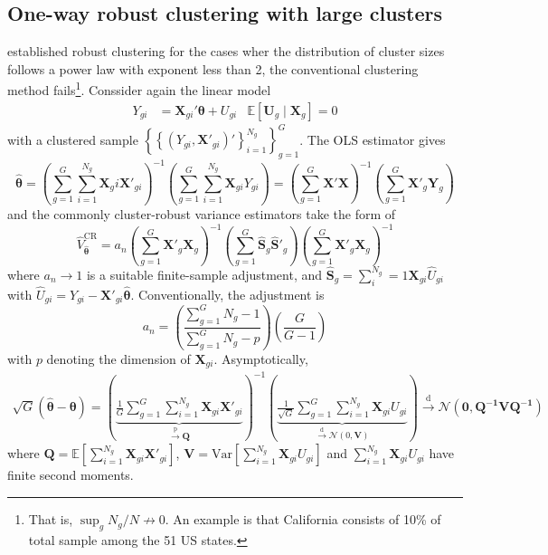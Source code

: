 \documentclass[twoside]{article}
\begin{document}
\subsection{One-way robust clustering with large clusters}
\citet{sasaki2022non} established robust clustering for the cases wher the distribution of cluster sizes follows a power law with exponent less than 2, the conventional clustering method fails\footnote{That is, $\sup_g N_g/N\not\rightarrow 0$. An example is that California consists of 10\% of total sample among the 51 US states.}. Conssider again the linear model
\begin{align*}
    Y_{gi} &= \mathbf{X}_{gi}'\boldsymbol{\theta} + U_{gi} & \mathbb{E}\left[\mathbf{U}_{g}\mid \mathbf{X}_g\right]=0
\end{align*}
with a clustered sample $\left\{ \left\{ \left(Y_{gi},\mathbf{X}'_{gi}\right)' \right\}^{N_g}_{i=1} \right\}^G_{g=1}$. The OLS estimator gives 
\begin{equation*}
    \hat{\boldsymbol{\theta}} = \left(\sum^G_{g=1}\sum^{N_g}_{i=1}\mathbf{X}_gi\mathbf{X}'_{gi}\right)^{-1} \left(\sum^G_{g=1}\sum^{N_g}_{i=1}\mathbf{X}_{gi}Y_{gi}\right) = \left(\sum^G_{g=1}\mathbf{X}'\mathbf{X}\right)^{-1}\left(\sum^G_{g=1}\mathbf{X}'_g\mathbf{Y}_g\right)
\end{equation*}
and the commonly cluster-robust variance estimators take the form of 
\begin{equation*}
    \hat{V}_{\hat{\boldsymbol{\theta}}}^{\mathrm{CR}} = a_n \left(\sum^G_{g=1} \mathbf{X}'_g\mathbf{X}_g \right)^{-1} \left(\sum^G_{g=1} \hat{\mathbf{S}}_g \hat{\mathbf{S}}'_g \right) \left(\sum^G_{g=1} \mathbf{X}'_g\mathbf{X}_g \right)^{-1}
\end{equation*}
where $a_n\rightarrow 1$ is a suitable finite-sample adjustment, and $\hat{\mathbf{S}}_g =\sum^{N_g}_i=1\mathbf{X}_{gi}\hat{U}_{gi}$ with $\hat{U}_{gi} = Y_{gi} - \mathbf{X}'_{gi}\hat{\boldsymbol{\theta}}$. Conventionally, the adjustment is 
$$
a_n = \left( \frac{\sum^G_{g=1}N_g-1}{\sum^G_{g=1} N_g -p} \right) \left(\frac{G}{G-1}\right)
$$
with $p$ denoting the dimension of $\mathbf{X}_{gi}$. Asymptotically,
\begin{align*}
    \sqrt{G}\left( \hat{\boldsymbol{\theta}} - \boldsymbol{\theta} \right) = \left( \underbrace{\frac{1}{G}\sum^G_{g=1}\sum^{N_g}_{i=1}\mathbf{X}_{gi}\mathbf{X}'_{gi}}_{\xrightarrow{\mathrm{p}}\mathbf{Q}} \right)^{-1} \left( \underbrace{ \frac{1}{\sqrt{G}} \sum^G_{g=1} \sum^{N_g}_{i=1} \mathbf{X}_{gi}U_{gi} }_{\xrightarrow{\mathrm{d}} \mathcal{N}\left(0,\mathbf{V}\right)} \right) \xrightarrow{\mathrm{d}} \mathcal{N} \left(\mathbf{0},\mathbf{Q^{-1}VQ^{-1}}\right)
\end{align*}
where $\mathbf{Q} = \mathbb{E}\left[ \sum^{N_g}_{i=1}\mathbf{X}_{gi}\mathbf{X}'_{gi} \right]$, $\mathbf{V} = \mathrm{Var}\left[\sum^{N_g}_{i=1} \mathbf{X}_{gi}U_{gi}\right]$ and $\sum^{N_g}_{i=1} \mathbf{X}_{gi}U_{gi}$ have finite second moments. 
\end{document}
